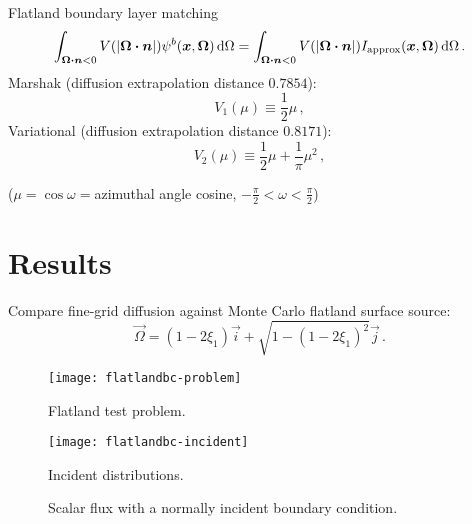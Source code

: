 \documentclass{beamer}
\begin{document}
\begin{frame}{Flatland boundary layer matching}
\begin{equation*}
\int_{\bm{\Omega}\bm{\cdot}\bm{n} < 0} V( \left| \bm{\Omega}\bm{\cdot}\bm{n} \right|)
\psi^b(\bm{x}, \bm{\Omega}) \mathop{}\!\mathrm{d}\Omega
=
\int_{\bm{\Omega}\bm{\cdot}\bm{n} < 0} V( \left| \bm{\Omega}\bm{\cdot}\bm{n} \right|)
I_\text{approx}(\bm{x}, \bm{\Omega}) \mathop{}\!\mathrm{d}\Omega \,.
\end{equation*}
Marshak (diffusion extrapolation distance $0.7854$):
\begin{equation*}
  V_1(\mu) \equiv \frac{1}{2} \mu \,,
\end{equation*}
Variational (diffusion extrapolation distance $0.8171$):
\begin{equation*}
  V_2(\mu) \equiv \frac{1}{2} \mu + \frac{1}{\pi}\mu^2 \,,
\end{equation*}

($\mu=\cos\omega={}$azimuthal angle cosine, $-\frac{\pi}{2} < \omega <
\frac{\pi}{2}$)
\end{frame}

\section{Results}
\begin{frame}
Compare fine-grid diffusion against Monte Carlo flatland surface source:
\begin{equation*}
  \vec{\Omega} = (1 - 2\xi_1) \vec{i} + \sqrt{1 - (1 - 2\xi_1)^2} \vec{j}\,.
\end{equation*}

\begin{figure}[tb]
  \texttt{[image: flatlandbc-problem]}

  \caption{Flatland test problem.}
  \label{fig:problem}
\end{figure}

\begin{figure}[tb]
  \centering\vspace{-.5in}%
  \texttt{[image: flatlandbc-incident]}

  \caption{Incident distributions.}
  \label{fig:distributions}
\end{figure}

\end{frame}

\begin{frame}
\begin{figure}[tb]
  \centering
  \hspace{-.5in}
  
  \hspace{-.5in}
  \caption{Scalar flux with a normally incident boundary condition.}
  \label{fig:delta}
\end{figure}
\end{frame}
\end{document}
